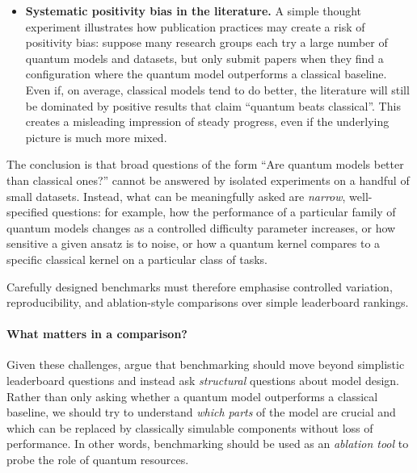 \documentclass[12pt,a4paper,openany]{report}
\let\textcite\citet
\begin{document}
\begin{itemize}
  
  \item \textbf{Systematic positivity bias in the literature.}  
  A simple thought experiment illustrates how publication practices may create a risk of positivity bias: suppose many research groups each try a large number of quantum models and datasets, but only submit papers when they find a configuration where the quantum model outperforms a classical baseline. Even if, on average, classical models tend to do better, the literature will still be dominated by positive results that claim ``quantum beats classical''. This creates a misleading impression of steady progress, even if the underlying picture is much more mixed.
\end{itemize}

The conclusion is that broad questions of the form ``Are quantum models better than classical ones?'' cannot be answered by isolated experiments on a handful of small datasets. Instead, what can be meaningfully asked are \emph{narrow}, well-specified questions: for example, how the performance of a particular family of quantum models changes as a controlled difficulty parameter increases, or how sensitive a given ansatz is to noise, or how a quantum kernel compares to a specific classical kernel on a particular class of tasks. 

Carefully designed benchmarks must therefore emphasise controlled variation, reproducibility, and ablation-style comparisons over simple leaderboard rankings.

\paragraph*{What matters in a comparison?}

Given these challenges, \textcite{bowles2024better} argue that benchmarking should move beyond simplistic leaderboard questions and instead ask \emph{structural} questions about model design. Rather than only asking whether a quantum model outperforms a classical baseline, we should try to understand \emph{which parts} of the model are crucial and which can be replaced by classically simulable components without loss of performance. In other words, benchmarking should be used as an \emph{ablation tool} to probe the role of quantum resources.
\end{document}

